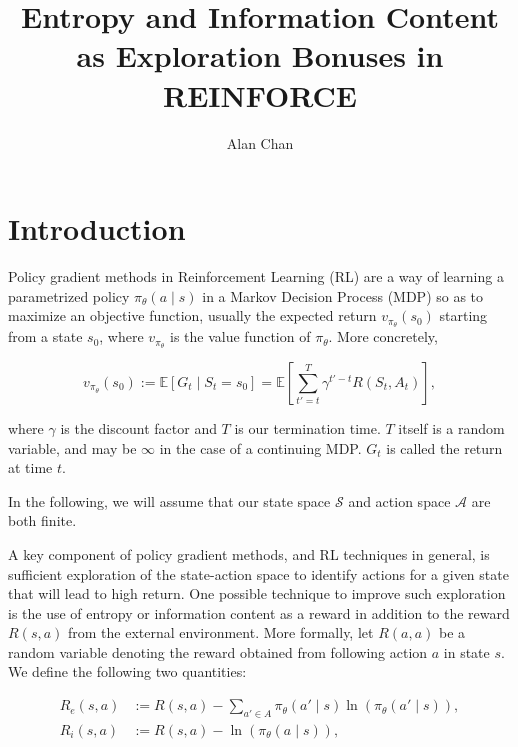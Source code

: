 \documentclass{article}
\title{Entropy and Information Content as Exploration Bonuses in REINFORCE}
\author{Alan Chan}
\date{}
\newcommand{\Ex}{\mathbb{E}}
\begin{document}
  \maketitle

  \section{Introduction}
  Policy gradient methods \citep[Chapter~13]{sutton2018reinforcement} in Reinforcement Learning (RL) are a way of learning a parametrized policy $\pi_\theta(a \mid s)$ in a Markov Decision Process (MDP) \citep[Chapter~3]{sutton2018reinforcement} so as to maximize an objective function, usually the expected return $v_{\pi_\theta}(s_0)$ starting from a state $s_0$, where $v_{\pi_\theta}$ is the value function of $\pi_\theta$. More concretely,

  \begin{equation*}
    v_{\pi_\theta}(s_0) := \Ex\left[G_t \mid S_t = s_0\right] = \Ex\left[\sum_{t' = t}^T \gamma^{t'- t} R(S_t, A_t) \right],
  \end{equation*}

  where $\gamma$ is the discount factor and $T$ is our termination time. $T$ itself is a random variable, and may be $\infty$ in the case of a continuing MDP. $G_t$ is called the return at time $t$.

  In the following, we will assume that our state space $\mathcal{S}$ and action space $\mathcal{A}$ are both finite.

  A key component of policy gradient methods, and RL techniques in general, is sufficient exploration of the state-action space to identify actions for a given state that will lead to high return. One possible technique to improve such exploration is the use of entropy or information content as a reward in addition to the reward $R(s, a)$ from the external environment. More formally, let $R(a, a)$ be a random variable denoting the reward obtained from following action $a$ in state $s$. We define the following two quantities:

  \begin{align*}
    R_e(s, a) &:= R(s, a) - \sum_{a' \in A} \pi_\theta(a' \mid s) \ln\left(\pi_\theta(a' \mid s)\right),\\
    R_i(s, a) &:= R(s, a) - \ln\left(\pi_\theta(a \mid s)\right),
  \end{align*}
\end{document}

